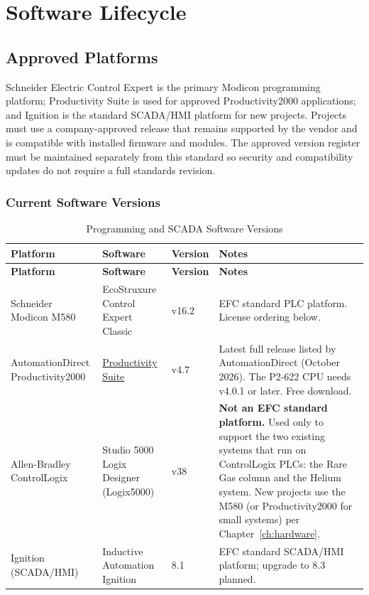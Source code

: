 \chapter{Software Lifecycle}
\section{Approved Platforms}
Schneider Electric Control Expert is the primary Modicon programming platform; Productivity Suite is used for approved Productivity2000 applications; and Ignition is the standard SCADA/HMI platform for new projects. Projects must use a company-approved release that remains supported by the vendor and is compatible with installed firmware and modules. The approved version register must be maintained separately from this standard so security and compatibility updates do not require a full standards revision.

\subsection{Current Software Versions}\label{sec:software-versions}
\begin{longtable}{@{}P{3.32cm}P{4.10cm}P{2.15cm}P{5.66cm}@{}}
\caption{Programming and SCADA Software Versions}\label{tab:software-versions} \\
\toprule
{}\textbf{Platform} & \textbf{Software} & \textbf{Version} & \textbf{Notes} \\
\midrule
\endfirsthead
\toprule
{}\textbf{Platform} & \textbf{Software} & \textbf{Version} & \textbf{Notes} \\
\midrule
\endhead
Schneider Modicon M580 & EcoStruxure Control Expert Classic & v16.2 & EFC standard PLC platform. License ordering below. \\
AutomationDirect Productivity2000 & \href{https://www.automationdirect.com/productivity/software/softwarewhatsnew}{Productivity Suite} & v4.7 & Latest full release listed by AutomationDirect (October 2026). The P2-622 CPU needs v4.0.1 or later. Free download. \\
Allen-Bradley ControlLogix & Studio 5000 Logix Designer (Logix5000) & v38 & \textbf{Not an EFC standard platform.} Used only to support the two existing systems that run on ControlLogix PLCs: the Rare Gas column and the Helium system. New projects use the M580 (or Productivity2000 for small systems) per Chapter~\ref{ch:hardware}. \\
Ignition (SCADA/HMI) & Inductive Automation Ignition & 8.1 & EFC standard SCADA/HMI platform; upgrade to 8.3 planned. \\
\bottomrule
\end{longtable}

